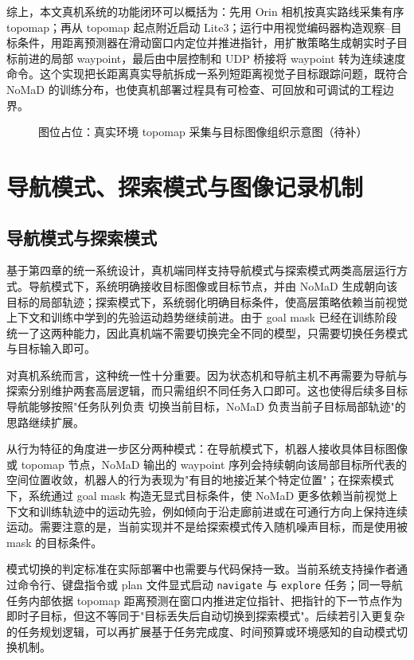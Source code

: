 综上，本文真机系统的功能闭环可以概括为：先用 Orin 相机按真实路线采集有序 topomap；再从 topomap 起点附近启动 Lite3；运行中用视觉编码器构造观察--目标条件，用距离预测器在滑动窗口内定位并推进指针，用扩散策略生成朝实时子目标前进的局部 waypoint，最后由中层控制和 UDP 桥接将 waypoint 转为连续速度命令。这个实现把长距离真实导航拆成一系列短距离视觉子目标跟踪问题，既符合 NoMaD 的训练分布，也使真机部署过程具有可检查、可回放和可调试的工程边界。

\begin{figure}[htbp]
    \centering
    \fbox{\rule{0pt}{55mm}\rule{0.86\linewidth}{0pt}}
    \caption{图位占位：真实环境 topomap 采集与目标图像组织示意图（待补）}
    \label{fig:real-topomap-placeholder}
\end{figure}

\section{导航模式、探索模式与图像记录机制}

\subsection{导航模式与探索模式}

基于第四章的统一系统设计，真机端同样支持导航模式与探索模式两类高层运行方式。导航模式下，系统明确接收目标图像或目标节点，并由 NoMaD
生成朝向该目标的局部轨迹；探索模式下，系统弱化明确目标条件，使高层策略依赖当前视觉上下文和训练中学到的先验运动趋势继续前进。由于 goal mask
已经在训练阶段统一了这两种能力\cite{nomad2023}，因此真机端不需要切换完全不同的模型，只需要切换任务模式与目标输入即可。

对真机系统而言，这种统一性十分重要。因为状态机和导航主机不再需要为导航与探索分别维护两套高层逻辑，而只需组织不同任务入口即可。这也使得后续多目标导航能够按照"任务队列负责
切换当前目标，NoMaD 负责当前子目标局部轨迹"的思路继续扩展。

从行为特征的角度进一步区分两种模式：在导航模式下，机器人接收具体目标图像或 topomap 节点，NoMaD 输出的 waypoint
序列会持续朝向该局部目标所代表的空间位置收敛，机器人的行为表现为"有目的地接近某个特定位置"；在探索模式下，系统通过 goal mask 构造无显式目标条件，使 NoMaD 更多依赖当前视觉上下文和训练轨迹中的运动先验，例如倾向于沿走廊前进或在可通行方向上保持连续运动。需要注意的是，当前实现并不是给探索模式传入随机噪声目标，而是使用被 mask 的目标条件。

模式切换的判定标准在实际部署中也需要与代码保持一致。当前系统支持操作者通过命令行、键盘指令或 plan 文件显式启动 \texttt{navigate} 与 \texttt{explore} 任务；同一导航任务内部依据 topomap 距离预测在窗口内推进定位指针、把指针的下一节点作为即时子目标，但这不等同于"目标丢失后自动切换到探索模式"。后续若引入更复杂的任务规划逻辑，可以再扩展基于任务完成度、时间预算或环境感知的自动模式切换机制。

